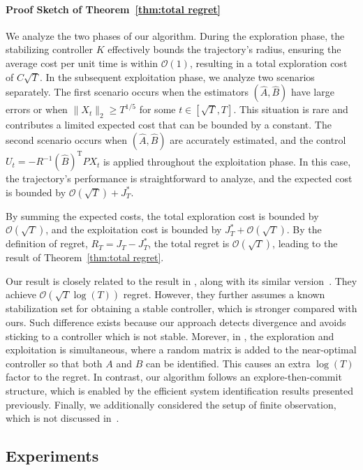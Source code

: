 \documentclass{article}
\theoremstyle{definition}
\begin{document}
\paragraph{Proof Sketch of Theorem~\ref{thm:total regret}}
We analyze the two phases of our algorithm. During the exploration phase, the stabilizing controller $K$ effectively bounds the trajectory's radius, ensuring the average cost per unit time is within $\mathcal{O}(1)$, resulting in a total exploration cost of $C\sqrt{T}$. In the subsequent exploitation phase, we analyze two scenarios separately.  
The first scenario occurs when the estimators $(\hat{A},\hat{B})$ have large errors or when $\|X_{t}\|_{2} \geq T^{1/5}$ for some $t \in [\sqrt{T},T]$. This situation is rare and contributes a limited expected cost that can be bounded by a constant.  
The second scenario occurs when $(\hat{A},\hat{B})$ are accurately estimated, and the control $U_{t}=-R^{-1}(\hat{B})^{\mathrm{T}}PX_{t}$ is applied throughout the exploitation phase. In this case, the trajectory's performance is straightforward to analyze, and the expected cost is bounded by $\mathcal{O}(\sqrt{T})+J^{*}_{T}$.

By summing the expected costs, the total exploration cost is bounded by $\mathcal{O}(\sqrt{T})$, and the exploitation cost is bounded by $J^{*}_{T}+\mathcal{O}(\sqrt{T})$. By the definition of regret, $R_{T}=J_{T}-J^{*}_{T}$, the total regret is $\mathcal{O}(\sqrt{T})$, leading to the result of Theorem~\ref{thm:total regret}.

Our result is closely related to the result in \cite{ref1}, along with its similar version~\cite{faradonbeh2022regret}. They achieve $\mathcal{O}(\sqrt{T}\log(T))$ regret. However, they further assumes a known stabilization set for obtaining a stable controller, which is stronger compared with ours. Such difference exists because our approach detects divergence and avoids sticking to a controller which is not stable. Morever, in \cite{ref1}, the exploration and exploitation is simultaneous, where a random matrix is added to the near-optimal controller so that both $A$ and $B$ can be identified. This causes an extra $\log(T)$ factor to the regret. In contrast, our algorithm follows an explore-then-commit structure, which is enabled by the efficient system identification results presented previously. Finally, we additionally considered the setup of finite observation, which is not discussed in~\cite{ref1}.

\subsection{Experiments}
\end{document}
